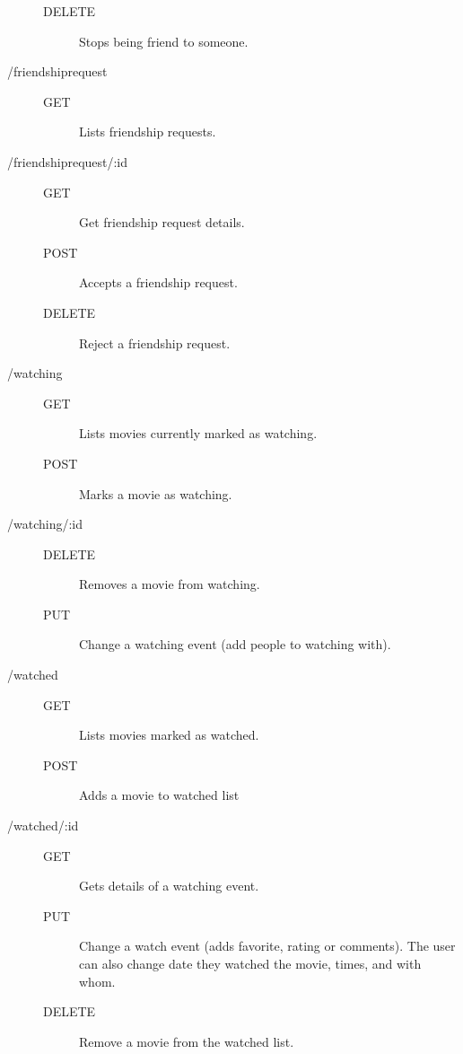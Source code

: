 \begin{description}
\begin{description}
      \item [DELETE] Stops being friend to someone.
    \end{description}
  \item [/friendshiprequest] \hfill
    \begin{description}
      \item [GET] Lists friendship requests.
    \end{description}
  \item [/friendshiprequest/:id] \hfill
    \begin{description}
      \item [GET] Get friendship request details.
      \item [POST] Accepts a friendship request.
      \item [DELETE] Reject a friendship request.
    \end{description}
  \item [/watching] \hfill
    \begin{description}
      \item [GET] Lists movies currently marked as watching.
      \item [POST] Marks a movie as watching.
    \end{description}
  \item [/watching/:id] \hfill
    \begin{description}
      \item [DELETE] Removes a movie from watching.
      \item [PUT] Change a watching event (add people to watching with).
    \end{description}
  \item [/watched] \hfill
    \begin{description}
      \item [GET] Lists movies marked as watched.
      \item [POST] Adds a movie to watched list
    \end{description}
  \item [/watched/:id] \hfill
    \begin{description}
      \item [GET] Gets details of a watching event.
      \item [PUT] Change a watch event (adds favorite, rating or comments). The
        user can also change date they watched the movie, times, and with whom.
      \item [DELETE] Remove a movie from the watched list.
    \end{description}

\end{description}
